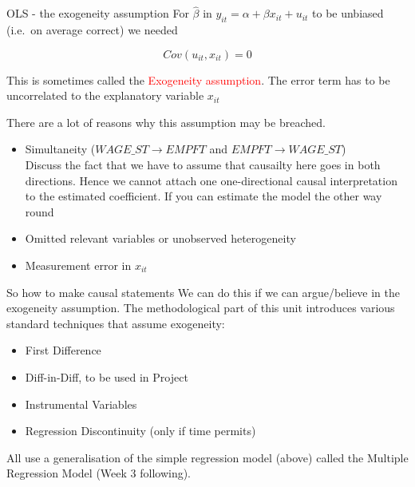 \documentclass[
  ignorenonframetext,
]{beamer}
\providecommand{\tightlist}{%
  \setlength{\itemsep}{0pt}\setlength{\parskip}{0pt}}
\begin{document}
\begin{frame}{OLS - the exogeneity assumption}
\label{ols---the-exogeneity-assumption}
For \(\widehat{\beta}\) in \(y_{it}=\alpha + \beta x_{it} + u_{it}\) to
be unbiased (i.e.~on average correct) we needed

\[Cov({u}_{it},x_{it})=0\]

This is sometimes called the \textcolor{red}{Exogeneity assumption}. The
error term has to be uncorrelated to the explanatory variable \(x_{it}\)

There are a lot of reasons why this assumption may be breached.

\begin{itemize}
  \item Simultaneity ($WAGE\_ST \rightarrow EMPFT$ and $EMPFT \rightarrow WAGE\_ST$)\\
  \footnotesize
  \textcolor{student}{Discuss the fact that we have to assume that causailty here goes in both directions. Hence we cannot attach one one-directional causal interpretation to the estimated coefficient. If you can estimate the model the other way round} \normalsize

  \item Omitted relevant variables or unobserved heterogeneity 
  \item Measurement error in $x_{it}$ 

\end{itemize}
\end{frame}

\begin{frame}{So how to make causal statements}
\label{so-how-to-make-causal-statements}
We can do this if we can argue/believe in the exogeneity assumption. The
methodological part of this unit introduces various standard techniques
that assume exogeneity:

\begin{itemize}
\tightlist
\item
  First Difference\\
\item
  Diff-in-Diff, to be used in Project
\item
  Instrumental Variables
\item
  Regression Discontinuity (only if time permits)
\end{itemize}

All use a generalisation of the simple regression model (above) called
the Multiple Regression Model (Week 3 following).
\end{frame}
\end{document}
